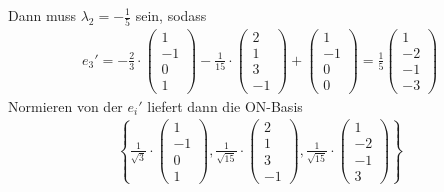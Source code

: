 Dann muss $\lambda_2 = - \frac{1}{5}$ sein, sodass
\begin{align*}
    e_3' = - \frac{2}{3} \cdot
    \begin{pmatrix}
        1\\-1\\0\\1
    \end{pmatrix}
    - \frac{1}{15} \cdot
    \begin{pmatrix}
        2\\1\\3\\-1
    \end{pmatrix}
    +
    \begin{pmatrix}
        1\\-1\\0\\0
    \end{pmatrix}
    = \frac{1}{5}
    \begin{pmatrix}
        1\\-2\\-1\\-3
    \end{pmatrix}
\end{align*}
Normieren von der $e_i'$ liefert dann die ON-Basis
\begin{align*}
    \left\{ \frac{1}{\sqrt{3}} \cdot
    \begin{pmatrix}
        1\\-1\\0\\1
    \end{pmatrix},
    \frac{1}{\sqrt{15}} \cdot
    \begin{pmatrix}
        2\\1\\3\\-1
    \end{pmatrix},
    \frac{1}{\sqrt{15}} \cdot
    \begin{pmatrix}
        1\\-2\\-1\\3
    \end{pmatrix}
    \right\}
\end{align*}



